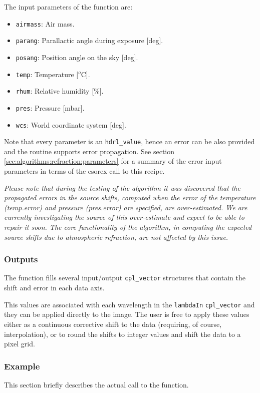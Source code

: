 The input parameters of the function are:
\begin{itemize}
  \item \verb+airmass+: Air mass.
  \item \verb+parang+: Parallactic angle during exposure [deg].
  \item \verb+posang+: Position angle on the sky [deg].
  \item \verb+temp+: Temperature [$^o$C].
  \item \verb+rhum+: Relative humidity [\%].
  \item \verb+pres+: Pressure [mbar].
  \item \verb+wcs+: World coordinate system [deg].
\end{itemize}
Note that every parameter is an \verb+hdrl_value+, hence an error can be also provided and the routine supports error propagation.
See section \ref{sec:algorithms:refraction:parameters} for a summary of the error input parameters in terms of the esorex call to this recipe.

\textit{Please note that during the testing of the algorithm it was
  discovered that the propagated errors in the source shifts, computed
  when the error of the temperature (temp.error) and pressure
  (pres.error) are specified, are over-estimated.  We are currently
  investigating the source of this over-estimate and expect to be able
  to repair it soon.  The core functionality of the algorithm, in
  computing the expected source shifts due to atmospheric refraction,
  are not affected by this issue.}

\subsubsection{Outputs}
\label{sec:algorithms:refraction:outputs}

The function fills several input/output \verb+cpl_vector+ structures that contain the shift and error in each data axis.

This values are associated with each wavelength in the \verb+lambdaIn+ \verb+cpl_vector+ and they can be applied directly to the image.
The user is free to apply these values either as a continuous corrective shift to the data (requiring, of course, interpolation), or to round the
shifts to integer values and shift the data to a pixel grid.


\subsubsection{Example}
\label{sec:algorithms:refraction:example}
This section briefly describes the actual call to the function.

